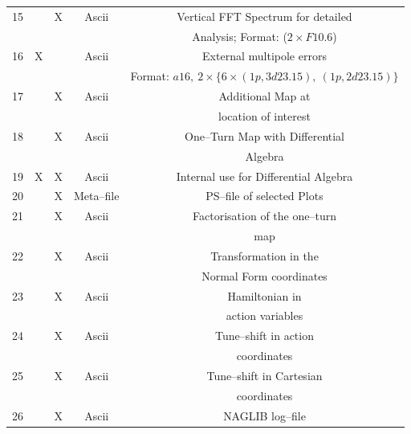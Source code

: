 \documentclass[a4paper,11pt]{report}
\begin{document}
\begin{center}
\begin{longtable}{|c|c|c|c|c|}
  \hline \rule[-1.25mm]{0mm}{7.5mm}
  15 & & X & Ascii & Vertical FFT Spectrum for detailed \\*
  \rule[-3.7mm]{0mm}{7.5mm}
  & & & & Analysis; Format: ($2 \times F10.6$) \\
  \hline \rule[-1.25mm]{0mm}{7.5mm}
  16 & X & & Ascii & External multipole errors \\*
  \rule[-3.7mm]{0mm}{7.5mm}
  & & & & Format: $a16,\ 2 \times \{6 \times (1p,3d23.15),\
  (1p,2d23.15)\}$ \\ 
  \hline \rule[-1.25mm]{0mm}{7.5mm}
  17 & & X & Ascii & Additional Map at \\*
  \rule[-3.7mm]{0mm}{7.5mm}
  & & & & location of interest \\
  \hline \rule[-1.25mm]{0mm}{7.5mm}
  18 & & X & Ascii & One--Turn Map with Differential \\*
  \rule[-3.7mm]{0mm}{7.5mm}
  & & & & Algebra \\
  \hline \rule[-3.75mm]{0mm}{10mm}
  19 & X & X & Ascii & Internal use for Differential Algebra \\
  \hline \rule[-3.75mm]{0mm}{10mm}
  20 & & X & Meta--file & PS--file of selected Plots \\
  \hline \rule[-1.25mm]{0mm}{7.5mm}
  21 & & X & Ascii & Factorisation of the one--turn \\*
  \rule[-3.7mm]{0mm}{7.5mm}
  & & & & map \\
  \hline \rule[-1.25mm]{0mm}{7.5mm}
  22 & & X & Ascii & Transformation in the \\*
  \rule[-3.7mm]{0mm}{7.5mm}
  & & & & Normal Form coordinates \\
  \hline \rule[-1.25mm]{0mm}{7.5mm}
  23 & & X & Ascii & Hamiltonian in \\*
  \rule[-3.7mm]{0mm}{7.5mm}
  & & & & action variables \\
  \hline \rule[-1.25mm]{0mm}{7.5mm}
  24 & & X & Ascii & Tune--shift in action \\*
  \rule[-3.7mm]{0mm}{7.5mm}
  & & & & coordinates \\
  \hline \rule[-1.25mm]{0mm}{7.5mm}
  25 & & X & Ascii & Tune--shift in Cartesian \\*
  \rule[-3.7mm]{0mm}{7.5mm}
  & & & & coordinates \\
  \hline \rule[-3.75mm]{0mm}{10mm}
  26 & & X & Ascii & NAGLIB log--file \\

\end{longtable}
\end{center}
\end{document}

